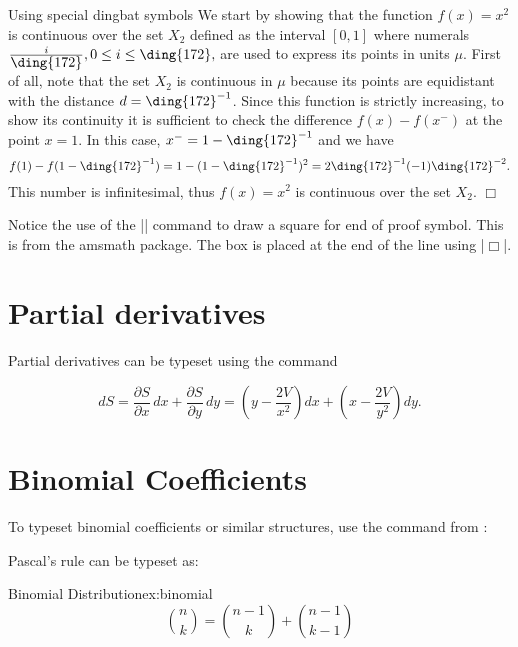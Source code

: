 \begin{texexample}{Using special dingbat symbols}{}
\label{e14}
 We start by showing that the function $f(x)=x^2$ is
continuous over the set $X_2$\label{p:X2} defined as the interval
$[0,1]$ where numerals $\frac{i}{\mbox{\ding{172}}}, 0 \le i \le
\mbox{\ding{172}},$ are used to express its points in units $\mu$.
First of all, note that the set $X_2$ is continuous in   $\mu$
because its points are equidistant with the distance
$d=\mbox{\ding{172}}^{-1}$. Since this function is strictly
increasing,  to show its continuity it is sufficient to check the
difference $f(x)-f(x^{-})$ at the point $x=1$. In this case,
$x^{-}=1-\mbox{\ding{172}}^{-1}$ and we have
\[
 f(1)-f(1-\mbox{\ding{172}}^{-1})=
 1-(1-\mbox{\ding{172}}^{-1})^2 =
 2\mbox{\ding{172}}^{-1}(-1)\mbox{\ding{172}}^{-2}.
\]
This number is infinitesimal, thus $f(x)=x^2$ is continuous over
the set $X_2$. \hfill $\Box$
\end{texexample}

Notice the use of the |\Box| command to draw a square for  end of proof symbol. This is from the amsmath package. The box is placed at the end of the line using |\hfill $\Box$|.




\section{Partial derivatives}

Partial derivatives can be typeset using the \latex{} command \CMDI{\partial}

\begin{texexample}{}{}

\[
dS = \frac{\partial S}{\partial x}\, dx
   + \frac{\partial S}{\partial y}\, dy
   = \left(y - \frac{2V}{x^2}\right) dx
   + \left(x - \frac{2V}{y^2}\right) dy.
\]
\end{texexample}




\section{Binomial Coefficients}

To typeset binomial coefficients or similar structures, use the command
 from :

Pascal's rule can be typeset as:


\begin{texexample}{Binomial Distribution}{ex:binomial}
\[
\binom{n}{k} =\binom{n-1}{k}
+ \binom{n-1}{k-1}
\]
\end{texexample}



